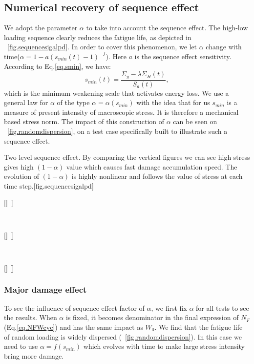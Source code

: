 \documentclass[3p,times,procedia,number]{elsarticle}
\newcommand{\figref}[1]{\figurename~\ref{#1}}
\begin{document}
\subsection{Numerical recovery of sequence effect}
We adopt the parameter $\alpha$ to take into account the sequence effect. The high-low loading sequence clearly reduces the fatigue life, as depicted in \figref{fig.sequencesigalpd}. In order to cover this phenomenon, we let $\alpha$ change with time($\alpha=1-a\left( s_{min}(t)-1\right)^{-f}$). Here $a$ is the sequence effect sensitivity. According to Eq.\eqref{eq.smin}, we have:
$$
s_{min}(t)=\dfrac{\Sigma_y-\lambda \Sigma_H(t)}{S_{a}(t)},
$$
which is the minimum weakening scale that activates energy loss.  We use a general law for $\alpha$ of the type $\alpha = \alpha (s_{min})$ with the idea that for us $s_{min}$ is a measure of present intensity of macroscopic stress. It is therefore a mechanical based stress norm. The impact of this construction of $\alpha$ can be seen on \figref{fig.randomdispersion}, on a test case specifically built to illustrate such a sequence effect.

\begin{Figure}[]{Two level sequence effect. By comparing the vertical figures we can see high stress gives high $(1-\alpha)$ value which causes fast damage accumulation speed. The evolution of $(1-\alpha)$ is highly nonlinear and follows the value of stress at each time step.}[fig.sequencesigalpd]
	\centerline{
		[]
		[]}
	\\
	\centerline{
		[]
		[]}
	\\
	\centerline{
		[]
		[]}
	\label{fig.sequencesigalpd}
\end{Figure}


\clearpage
\subsubsection{Major damage effect}

To see the influence of sequence effect factor of $\alpha$, we first fix $\alpha$ for all tests to see the results. When $\alpha$ is fixed, it becomes denominator in the final expression of $N_F$ (Eq.\eqref{eq.NFWcyc}) and has the same impact as $W_0$. We find  that the fatigue life of random loading is widely dispersed (\figref{fig.randomdispersion}). In this case we need to use $\alpha=f(s_{min})$ which evolves with time to make large stress intensity bring more damage.
\end{document}
